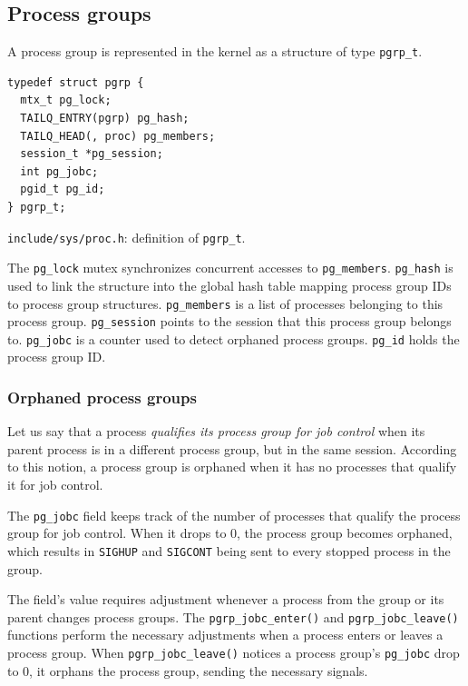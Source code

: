 \documentclass[shortabstract, manyadvisors, english, mgr]{iithesis}
\begin{document}
\subsection{Process groups}
A process group is represented in the kernel as a structure of type \texttt{pgrp\_t}.
\begin{listing}[H]
\begin{verbatim}
typedef struct pgrp {
  mtx_t pg_lock;
  TAILQ_ENTRY(pgrp) pg_hash;
  TAILQ_HEAD(, proc) pg_members;
  session_t *pg_session;
  int pg_jobc;
  pgid_t pg_id;
} pgrp_t;
\end{verbatim}
\caption{\texttt{include/sys/proc.h}: definition of \texttt{pgrp\_t}.}
\end{listing}

The \texttt{pg\_lock} mutex synchronizes concurrent accesses to
\texttt{pg\_members}. \texttt{pg\_hash} is used to link the structure into the
global hash table mapping process group IDs to process group structures.
\texttt{pg\_members} is a list of processes belonging to this process group.
\texttt{pg\_session} points to the session that this process group belongs to.
\texttt{pg\_jobc} is a counter used to detect orphaned process groups.
\texttt{pg\_id} holds the process group ID.

\subsubsection{Orphaned process groups}

Let us say that a process \textit{qualifies its process group for job control}
when its parent process is in a different process group, but in the same
session. According to this notion, a process group is orphaned when it has no
processes that qualify it for job control.

The \texttt{pg\_jobc} field keeps track of the number of processes that qualify
the process group for job control. When it drops to 0, the process group becomes
orphaned, which results in \texttt{SIGHUP} and \texttt{SIGCONT} being sent to
every stopped process in the group.

The field's value requires adjustment whenever a process from the group or its
parent changes process groups. The \texttt{pgrp\_jobc\_enter()} and
\texttt{pgrp\_jobc\_leave()} functions perform the necessary adjustments when a
process enters or leaves a process group. When \texttt{pgrp\_jobc\_leave()}
notices a process group's \texttt{pg\_jobc} drop to 0, it orphans the process
group, sending the necessary signals.
\end{document}
